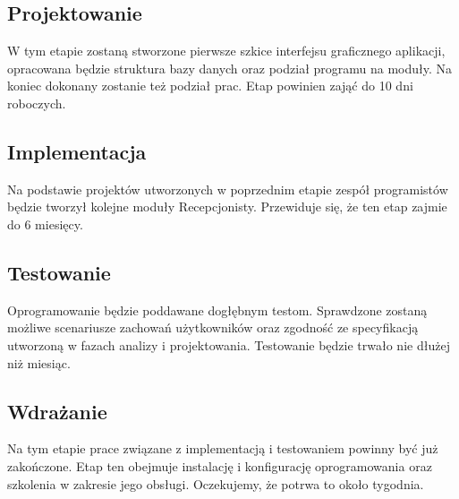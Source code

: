\documentclass [11pt, a4paper, leqno] {article}
\begin{document}
\subsection{Projektowanie}
\noindent
W tym etapie zostaną stworzone pierwsze szkice interfejsu graficznego aplikacji, opracowana będzie struktura bazy danych oraz podział programu na moduły. Na koniec dokonany zostanie też podział prac. Etap powinien zająć do 10 dni roboczych.

\subsection{Implementacja}
\noindent
Na podstawie projektów utworzonych w poprzednim etapie zespół programistów będzie tworzył kolejne moduły Recepcjonisty. Przewiduje się, że ten etap zajmie do 6 miesięcy.

\subsection{Testowanie}
\noindent
Oprogramowanie będzie poddawane dogłębnym testom. Sprawdzone zostaną możliwe scenariusze zachowań użytkowników oraz zgodność ze specyfikacją utworzoną w fazach analizy i projektowania. Testowanie będzie trwało nie dłużej niż miesiąc.

\subsection{Wdrażanie}
\noindent
Na tym etapie prace związane z implementacją i testowaniem powinny być już zakończone. Etap ten obejmuje instalację i konfigurację oprogramowania oraz szkolenia w zakresie jego obsługi. Oczekujemy, że potrwa to około tygodnia.
\end{document}
